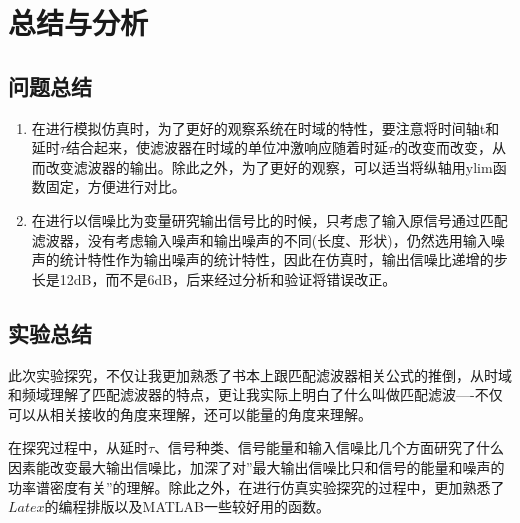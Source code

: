 \documentclass[a4paper]{article}
\begin{document}
\section{总结与分析}
\subsection{问题总结}
\begin{enumerate}[(1)]
\item
在进行模拟仿真时，为了更好的观察系统在时域的特性，要注意将时间轴t和延时$\tau$结合起来，使滤波器在时域的单位冲激响应随着时延$\tau$的改变而改变，从而改变滤波器的输出。除此之外，为了更好的观察，可以适当将纵轴用ylim函数固定，方便进行对比。

\item 
在进行以信噪比为变量研究输出信号比的时候，只考虑了输入原信号通过匹配滤波器，没有考虑输入噪声和输出噪声的不同(长度、形状)，仍然选用输入噪声的统计特性作为输出噪声的统计特性，因此在仿真时，输出信噪比递增的步长是12dB，而不是6dB，后来经过分析和验证将错误改正。

\end{enumerate}

\subsection{实验总结}
此次实验探究，不仅让我更加熟悉了书本上跟匹配滤波器相关公式的推倒，从时域和频域理解了匹配滤波器的特点，更让我实际上明白了什么叫做匹配滤波----不仅可以从相关接收的角度来理解，还可以能量的角度来理解。

在探究过程中，从延时$\tau$、信号种类、信号能量和输入信噪比几个方面研究了什么因素能改变最大输出信噪比，加深了对''最大输出信噪比只和信号的能量和噪声的功率谱密度有关''的理解。除此之外，在进行仿真实验探究的过程中，更加熟悉了$Latex$的编程排版以及MATLAB一些较好用的函数。
\end{document}
